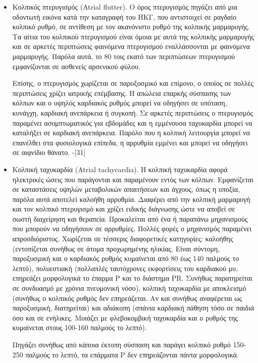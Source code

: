 \begin{itemize}
	\item Κολπικός πτερυγισμός (\en Atrial flutter). \gr Ο όρος πτερυγισμός πηγάζει από μια οδοντωτή εικόνα κατά την καταγραφή του ΗΚΓ, που αντιστοιχεί σε ραγδαίο κολπικό ρυθμό, σε αντίθεση με τον ακανόνιστο ρυθμό της κολπικής μαρμαρυγής. Τα αίτια του κολπικού πτερυγισμού είναι όμοια με αυτά της κολπικής μαρμαρυγής και σε αρκετές περιπτώσεις φαινόμενα πτερυγισμού εναλλάσσονται με φαινόμενα μαρμαρυγής. Παρόλα αυτά, το 80 τοις εκατό των περιπτώσεων πτερυγισμού εμφανίζονται σε ασθενείς αρσενικού φύλου.
	\par
	Επίσης, ο πτερυγισμός χωρίζεται σε παροξυσμικό και επίμονο, ο οποίος σε πολλές περιπτώσεις χρίζει ιατρικής επέμβασης. Η απώλεια επαρκής σύσπασης των κόλπων και ο υψηλός καρδιακός ρυθμός μπορεί να οδηγήσει σε υπόταση, κυνάγχη, καρδιακή ανεπάρκεια ή συγκοπή. Σε αρκετές περιπτώσεις ο πτερυγισμός παραμένει ασυμπτωματικός για εβδομάδες και η εμμένουσα ταχυκαρδία μπορεί να καταλήξει σε καρδιακή ανεπάρκεια. Παρόλο που η κολπική λειτουργία μπορεί να επανέλθει στα φυσιολογικά επίπεδα, η αρρυθμία εμμένει και μπορεί να οδηγήσει σε αιφνίδιο θάνατο. \en [30]-[31]\gr
	\item Κολπική ταχυκαρδία \en (Atrial tachycardia). \gr Η κολπική ταχυκαρδία αφορά ηλεκτρικές ώσεις που παράγονται και παραμένουν εντός των κόλπων. Εμφανίζεται σε καταστάσεις υψηλών μεταβολικών απαιτήσεων και άγχους, όπως η υποξία, παρόλα αυτά αποτελεί καλοήθη αρρυθμία. Διαφέρει από την κολπική μαρμαρυγή και τον κολπικό πτερυγισμό και χρίζει ειδικής διάγνωσης ώστε να αποβεί σε σωστή διαχείρηση και θεραπεία. Προκαλείται από ένα ή παραπάνω μηχανισμούς που μπορούν να οδηγήσουν σε αρρυθμίες. Πολλές φορές ο μηχανισμός παραμένει απροσδιόριστος. Χωρίζεται σε τέσσερις διαφορετικές κατηγορίες: καλοήθης (εντοπίζεται συνήθως σε άτομα προχωρημένης ηλικίας. Είναι σύντομη, παροξυσμική και ο καρδιακός ρυθμός κυμαίνεται από 80 έως 140  παλμούς το λεπτό), πολυεστιακή (πολλαπλές ταυτόχρονες εκφορτίσεις του καρδιακού μυ, επηρεάζει μορφολογικά το έπαρμα Ρ και το διάστημα \en PR. \gr Συνήθως παρατηρείται σε συνδυασμό με χρόνια πνευμονική νόσο), κολπική ταχυκαρδία με αποκλεισμό (συνήθως ο κολπικός ρυθμός δεν επηρεάζεται. Αν και συνήθως αναφέρεται ως παροξυσμική, διατηρείται) και αδιάκοπη (σπάνια καρδιακή πάθηση τόσο σε παιδιά όσο και σε ενήλικες. Μοιάζει με φλεβοκομβική ταχυκαρδία και ο ρυθμός της κυμαίνεται στους 100-160 παλμούς το λεπτό). \par
	Πηγάζει συνήθως από κάποια έκτοπη σύσπαση και παράγει κολπικό ρυθμό 150-250 παλμούς το λεπτό, τα επάρματα Ρ δεν επηρεάζονται πάντα μορφολογικά. 

\end{itemize}
